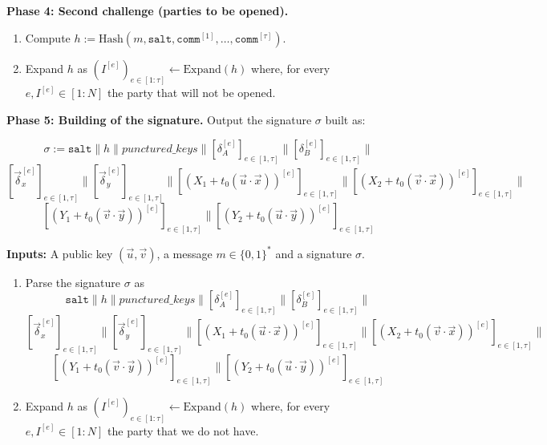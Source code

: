 \documentclass[english]{article}
\begin{document}
\begin{tcolorbox}[title=Protocol 1: Signature scheme - Signing Algorithm, breakable, enhanced, colback=white, colframe=black]
			\vspace{0.5em}
			\textbf{Phase 4: Second challenge (parties to be opened).}
			\begin{enumerate}[label=\arabic*.]
				\item Compute $h := \text{Hash}(m, \texttt{salt}, \texttt{comm}^{[1]}, \dots, \texttt{comm}^{[\tau]})$.
				\item Expand $h$ as $(I^{[e]})_{e \in [1:\tau]} \leftarrow \text{Expand}(h)$ where, for every $e, I^{[e]} \in [1:N]$ the party that will not be opened.
			\end{enumerate}
			
			\vspace{0.5em}
			\textbf{Phase 5: Building of the signature.} Output the signature $\sigma$ built as:
			
			$$
			\sigma := \texttt{salt} \parallel
			h \parallel
			punctured\_keys \parallel
			[\delta_A^{[e]}]_{e\in[1,\tau]} \parallel
			[\delta_B^{[e]}]_{e\in[1,\tau]} \parallel
			$$
			$$
			[\vec{\delta}_x^{[e]}]_{e\in[1,\tau]} \parallel [\vec{\delta}_y^{[e]}]_{e\in[1,\tau]} \parallel
			[(X_1 + t_0(\vec{u} \cdot \vec{x}))^{[e]}]_{e\in[1,\tau]} \parallel
			[(X_2 + t_0(\vec{v} \cdot \vec{x}))^{[e]}]_{e\in[1,\tau]} \parallel
			$$
			$$
			[(Y_1 + t_0(\vec{v} \cdot \vec{y}))^{[e]}]_{e\in[1,\tau]} \parallel
			[(Y_2 + t_0(\vec{u} \cdot \vec{y}))^{[e]}]_{e\in[1,\tau]}
			$$
		\end{tcolorbox}
		
		\begin{tcolorbox}[title=Protocol 2: Signature scheme - Verification Algorithm, breakable, enhanced, colback=white, colframe=black]\label{Protocol_verif}
			\textbf{Inputs:} A public key $(\vec{u}, \vec{v})$, a message $m \in \{0,1\}^*$ and a signature $\sigma$.
			
			\begin{enumerate} 
			\item Parse the signature $\sigma$ as
			$$
			\texttt{salt} \parallel
			h \parallel
			punctured\_keys \parallel
			[\delta_A^{[e]}]_{e\in[1,\tau]} \parallel
			[\delta_B^{[e]}]_{e\in[1,\tau]} \parallel
			$$
			$$
			[\vec{\delta}_x^{[e]}]_{e\in[1,\tau]} \parallel [\vec{\delta}_y^{[e]}]_{e\in[1,\tau]} \parallel
			[(X_1 + t_0(\vec{u} \cdot \vec{x}))^{[e]}]_{e\in[1,\tau]} \parallel
			[(X_2 + t_0(\vec{v} \cdot \vec{x}))^{[e]}]_{e\in[1,\tau]} \parallel
			$$
			$$
			[(Y_1 + t_0(\vec{v} \cdot \vec{y}))^{[e]}]_{e\in[1,\tau]} \parallel
			[(Y_2 + t_0(\vec{u} \cdot \vec{y}))^{[e]}]_{e\in[1,\tau]}
			$$
			
			\item Expand $h$ as $(I^{[e]})_{e \in [1:\tau]} \leftarrow \text{Expand}(h)$ where, for every $e, I^{[e]} \in [1:N]$ the party that we do not have.
			\end{enumerate}
		\end{tcolorbox}
	
\end{document}
